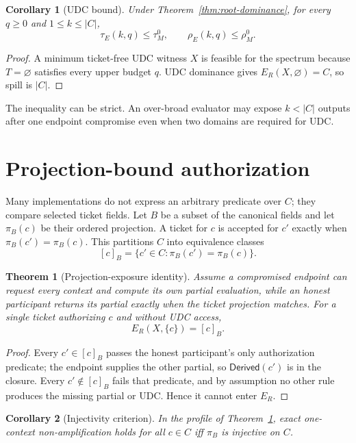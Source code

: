 \documentclass[preprint,12pt]{elsarticle}
\newtheorem{theorem}{Theorem}
\newtheorem{corollary}{Corollary}
\newcommand{\Derived}{\mathsf{Derived}}
\begin{document}
\begin{corollary}[UDC bound]
Under Theorem~\ref{thm:root-dominance}, for every $q\ge0$ and
$1\le k\le|C|$,
\[
\tau_E(k,q)\le\tau_M^{0},\qquad
\rho_E(k,q)\le\rho_M^{0}.
\]
\end{corollary}

\begin{proof}
A minimum ticket-free UDC witness $X$ is feasible for the spectrum because
$T=\varnothing$ satisfies every upper budget $q$.  UDC dominance gives
$E_R(X,\varnothing)=C$, so spill is $|C|$.
\end{proof}

The inequality can be strict.  An over-broad evaluator may expose $k<|C|$
outputs after one endpoint compromise even when two domains are required for
UDC.

\section{Projection-bound authorization}

Many implementations do not express an arbitrary predicate over $C$; they
compare selected ticket fields.  Let $B$ be a subset of the canonical fields
and let $\pi_B(c)$ be their ordered projection.  A ticket for $c$ is accepted
for $c'$ exactly when $\pi_B(c')=\pi_B(c)$.  This partitions $C$ into
equivalence classes
\[
[c]_B=\{c'\in C:\pi_B(c')=\pi_B(c)\}.
\]

\begin{theorem}[Projection-exposure identity]
\label{thm:projection}
Assume a compromised endpoint can request every context and compute its own
partial evaluation, while an honest participant returns its partial exactly
when the ticket projection matches.  For a single ticket authorizing $c$ and
without UDC access,
\[
E_R(X,\{c\})=[c]_B.
\]
\end{theorem}

\begin{proof}
Every $c'\in[c]_B$ passes the honest participant's only authorization predicate;
the endpoint supplies the other partial, so $\Derived(c')$ is in the closure.
Every $c'\notin[c]_B$ fails that predicate, and by assumption no other rule
produces the missing partial or UDC.  Hence it cannot enter
$E_R$.
\end{proof}

\begin{corollary}[Injectivity criterion]
In the profile of Theorem~\ref{thm:projection}, exact one-context
non-amplification holds for all $c\in C$ iff $\pi_B$ is injective on $C$.
\end{corollary}
\end{document}
